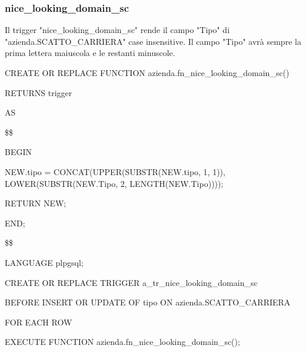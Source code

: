         \subsubsection{nice\_looking\_domain\_sc}
        Il trigger "nice\_looking\_domain\_sc" rende il campo "Tipo" di "azienda.SCATTO\_CARRIERA" case insensitive. Il campo "Tipo" avrà sempre la prima lettera maiuscola e le restanti minuscole.
        \ttfamily
            \begin{flushleft}
                \begin{description}
                    \item CREATE OR REPLACE FUNCTION azienda.fn\_nice\_looking\_domain\_sc()  
                    \item RETURNS trigger
                    \item AS
                    \item \$\$
                    \item BEGIN 
                    \begin{description}
                        \item NEW.tipo = CONCAT(UPPER(SUBSTR(NEW.tipo, 1, 1)), LOWER(SUBSTR(NEW.Tipo, 2, LENGTH(NEW.Tipo))));

                        \item RETURN NEW;
                    \end{description}
                    \item END;
                    \item \$\$
                    \item LANGUAGE plpgsql;
                \end{description}
            \end{flushleft}
        \normalfont

        \ttfamily
            \begin{flushleft}
                \begin{description}
                    \item CREATE OR REPLACE TRIGGER a\_tr\_nice\_looking\_domain\_sc
                    \item BEFORE INSERT OR UPDATE OF tipo ON azienda.SCATTO\_CARRIERA
                    \item FOR EACH ROW
                    \item EXECUTE FUNCTION azienda.fn\_nice\_looking\_domain\_sc();
                \end{description}
            \end{flushleft}
        \normalfont

